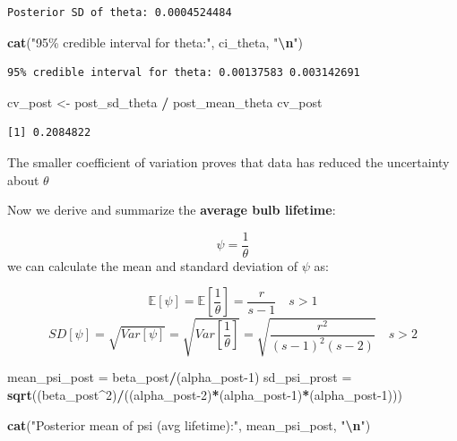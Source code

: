 \documentclass[
]{article}
\newenvironment{Shaded}{\begin{snugshade}}{\end{snugshade}}
\newcommand{\DecValTok}[1]{\textcolor[rgb]{0.00,0.00,0.81}{#1}}
\newcommand{\FunctionTok}[1]{\textcolor[rgb]{0.13,0.29,0.53}{\textbf{#1}}}
\newcommand{\NormalTok}[1]{#1}
\newcommand{\OtherTok}[1]{\textcolor[rgb]{0.56,0.35,0.01}{#1}}
\newcommand{\SpecialCharTok}[1]{\textcolor[rgb]{0.81,0.36,0.00}{\textbf{#1}}}
\newcommand{\StringTok}[1]{\textcolor[rgb]{0.31,0.60,0.02}{#1}}
\begin{document}
\begin{verbatim}
Posterior SD of theta: 0.0004524484 
\end{verbatim}

\begin{Shaded}
\begin{Highlighting}[]
\FunctionTok{cat}\NormalTok{(}\StringTok{"95\% credible interval for theta:"}\NormalTok{, ci\_theta, }\StringTok{"}\SpecialCharTok{\textbackslash{}n}\StringTok{"}\NormalTok{)}
\end{Highlighting}
\end{Shaded}

\begin{verbatim}
95% credible interval for theta: 0.00137583 0.003142691 
\end{verbatim}

\begin{Shaded}
\begin{Highlighting}[]
\NormalTok{cv\_post }\OtherTok{\textless{}{-}}\NormalTok{ post\_sd\_theta }\SpecialCharTok{/}\NormalTok{ post\_mean\_theta}
\NormalTok{cv\_post}
\end{Highlighting}
\end{Shaded}

\begin{verbatim}
[1] 0.2084822
\end{verbatim}

The smaller coefficient of variation proves that data has reduced the
uncertainty about \(\theta\)

Now we derive and summarize the \textbf{average bulb lifetime}:

\[
\psi = \frac{1}{\theta}
\] we can calculate the mean and standard deviation of \(\psi\) as:

\[
\mathbb{E}[\psi] = \mathbb{E}\left[\frac{1}{\theta}\right] = \frac{r}{s-1} \quad s>1 
\] \[
SD[\psi] = \sqrt{Var[\psi]} = \sqrt{Var\left[\frac{1}{\theta}\right]} = \sqrt{\frac{r^2}{(s-1)^2(s-2)}} \quad s>2
\]

\begin{Shaded}
\begin{Highlighting}[]
\NormalTok{mean\_psi\_post }\OtherTok{=}\NormalTok{ beta\_post}\SpecialCharTok{/}\NormalTok{(alpha\_post}\DecValTok{{-}1}\NormalTok{)}
\NormalTok{sd\_psi\_prost }\OtherTok{=} \FunctionTok{sqrt}\NormalTok{((beta\_post}\SpecialCharTok{\^{}}\DecValTok{2}\NormalTok{)}\SpecialCharTok{/}\NormalTok{((alpha\_post}\DecValTok{{-}2}\NormalTok{)}\SpecialCharTok{*}\NormalTok{(alpha\_post}\DecValTok{{-}1}\NormalTok{)}\SpecialCharTok{*}\NormalTok{(alpha\_post}\DecValTok{{-}1}\NormalTok{)))}

\FunctionTok{cat}\NormalTok{(}\StringTok{"Posterior mean of psi (avg lifetime):"}\NormalTok{, mean\_psi\_post, }\StringTok{"}\SpecialCharTok{\textbackslash{}n}\StringTok{"}\NormalTok{)}
\end{Highlighting}
\end{Shaded}
\end{document}
